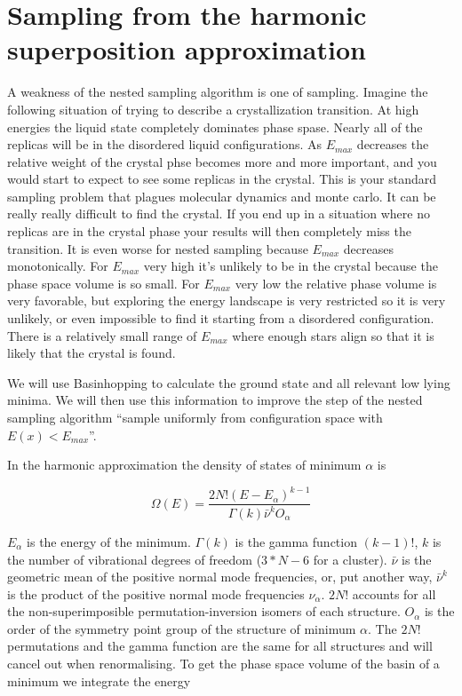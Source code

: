 \documentclass[a4paper]{article}
\begin{document}
\section{Sampling from the harmonic superposition approximation}

A weakness of the nested sampling algorithm is one of sampling.  Imagine the following situation
of trying to describe a crystallization transition.  At high energies the liquid state
completely dominates phase spase.  Nearly all of the replicas will be in the disordered liquid
configurations.  As $E_{max}$ decreases the relative weight of the crystal phse becomes more 
and more important, and you would start to expect to see some replicas in the crystal.  This is
your standard sampling problem that plagues molecular dynamics and monte carlo.
It can be really really difficult to find the crystal.  If you end up in a
situation where no replicas are in the crystal phase your results will then
completely miss the transition.  It is even worse for nested sampling because $E_{max}$ decreases
monotonically. For $E_{max}$ very high it's unlikely to be in the crystal because the phase space 
volume is so small.  For $E_{max}$ very low the relative phase volume is very
favorable, but exploring the energy landscape is very restricted so it is very
unlikely, or even impossible to find it starting from a disordered
configuration.  There is a relatively small range of $E_{max}$ where enough stars align so that
it is likely that the crystal is found.

We will use Basinhopping to calculate the ground state and all relevant low lying minima.
We will then use this information to improve the step of the nested sampling
algorithm ``sample uniformly from configuration space with $E(x) < E_{max}$''.

In the harmonic approximation the density of states of minimum $\alpha$ is

\begin{equation}
  \Omega(E) = \frac{2N!(E - E_\alpha)^{k-1} }{\Gamma(k) \bar{\nu}^k O_\alpha}
\end{equation}

$E_\alpha$ is the energy of the minimum.  $\Gamma(k)$ is the gamma function $(k-1)!$, $k$ is the number
of vibrational degrees of freedom ($3*N-6$ for a cluster).  $\bar{\nu}$ is the
geometric mean of the positive normal mode frequencies, or, put another way,
$\bar{\nu}^k$ is the product of the positive normal mode frequencies
$\nu_{\alpha}$.  $2N!$ accounts for all the non-superimposible
permutation-inversion isomers of each structure. $O_\alpha$ is the order of the
symmetry point group of the structure of minimum $\alpha$.  The $2N!$
permutations and the gamma function are the same for all structures and will
cancel out when renormalising.
To get the phase space volume of the basin of a minimum we integrate the energy
\end{document}
